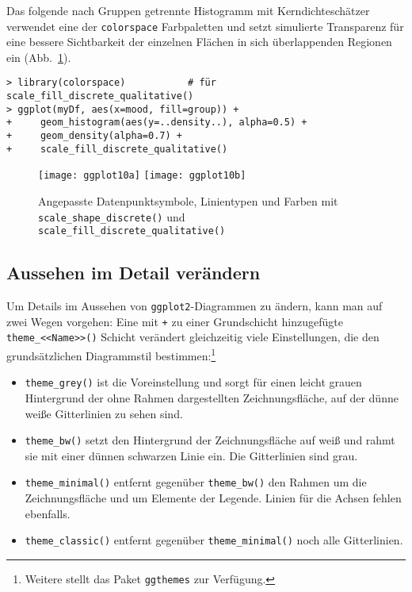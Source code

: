 Das folgende nach Gruppen getrennte Histogramm mit Kerndichteschätzer verwendet eine der \lstinline!colorspace! Farbpaletten und setzt simulierte Transparenz für eine bessere Sichtbarkeit der einzelnen Flächen in sich überlappenden Regionen ein (Abb.\ \ref{fig:ggplot10}).
\begin{lstlisting}
> library(colorspace)           # für scale_fill_discrete_qualitative()
> ggplot(myDf, aes(x=mood, fill=group)) +
+     geom_histogram(aes(y=..density..), alpha=0.5) +
+     geom_density(alpha=0.7) +
+     scale_fill_discrete_qualitative()
\end{lstlisting}

\begin{figure}[ht]
\centering
\texttt{[image: ggplot10a]}
\texttt{[image: ggplot10b]}
\vspace*{-0.5em}
\caption{Angepasste Datenpunktsymbole, Linientypen und Farben mit \lstinline!scale_shape_discrete()! und \lstinline!scale_fill_discrete_qualitative()!}
\label{fig:ggplot10}
\end{figure}

\subsection{Aussehen im Detail verändern}
\label{sec:ggplotTheme}

Um Details im Aussehen von \lstinline!ggplot2!-Diagrammen zu ändern, kann man auf zwei Wegen vorgehen: Eine mit \lstinline!+! zu einer Grundschicht hinzugefügte \lstinline!theme_<<Name>>()! Schicht verändert gleichzeitig viele Einstellungen, die den grundsätzlichen Diagrammstil bestimmen:\footnote{Weitere stellt das Paket  \lstinline!ggthemes! \cite{Arnold2016} zur Verfügung.}
\begin{itemize}
\item {}\lstinline!theme_grey()! ist die Voreinstellung und sorgt für einen leicht grauen Hintergrund der ohne Rahmen dargestellten Zeichnungsfläche, auf der dünne weiße Gitterlinien zu sehen sind.
\item {}\lstinline!theme_bw()! setzt den Hintergrund der Zeichnungsfläche auf weiß und rahmt sie mit einer dünnen schwarzen Linie ein. Die Gitterlinien sind grau.
\item {}\lstinline!theme_minimal()! entfernt gegenüber \lstinline!theme_bw()! den Rahmen um die Zeichnungsfläche und um Elemente der Legende. Linien für die Achsen fehlen ebenfalls.
\item {}\lstinline!theme_classic()! entfernt gegenüber \lstinline!theme_minimal()! noch alle Gitterlinien.
\end{itemize}


